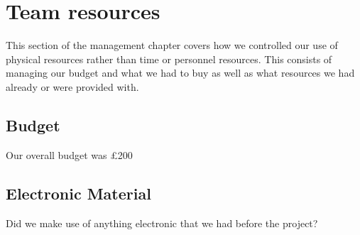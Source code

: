 \section{Team resources}
\label{team_resources}

This section of the management chapter covers how we controlled our use of physical resources rather than time or personnel resources. This consists of managing our budget and what we had to buy as well as what resources we had already or were provided with.

\subsection{Budget}

Our overall budget was £200

\subsection{Electronic Material}

Did we make use of anything electronic that we had before the project?
